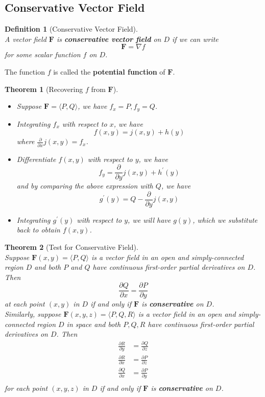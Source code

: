 \documentclass[12pt]{article}
\newtheorem{definition}{Definition}[section]
\newtheorem{theorem}{Theorem}[section]
\theoremstyle{definition}
\begin{document}
\subsection{Conservative Vector Field}
\begin{definition}[Conservative Vector Field]
\hfill\\\normalfont A vector field $\mathbf{F}$ is \textbf{conservative vector field} on $D$ if we can write
\[
\mathbf{F}= \nabla f
\]
for some scalar function $f$ on $D$.
\end{definition}
The function $f$ is called the \textbf{potential function} of $\mathbf{F}$.
\begin{theorem}[Recovering {$f$} from {$\mathbf{F}$}]\hfill\\\normalfont
\begin{itemize}
  \item Suppose $\mathbf{F} = \langle P,Q\rangle$, we have $f_x = P, f_y = Q$.
  \item Integrating $f_x$ with respect to $x$, we have
  \[
f(x,y) = j(x,y)+h(y)
  \]
  where $\frac{\partial}{\partial x}j(x,y) = f_x$.
  \item Differentiate $f(x,y)$ with respect to $y$, we have
  \[
f_y = \frac{\partial }{\partial y}j(x,y)+h^\prime(y)
  \]
  and by comparing the above expression with $Q$, we have\[g^\prime(y) = Q-\frac{\partial }{\partial y}j(x,y)\]
  \item Integrating $g^\prime(y)$ with respect to $y$, we will have $g(y)$, which we substitute back to obtain $f(x,y)$.
\end{itemize}
\end{theorem}
\begin{theorem}[Test for Conservative Field]
\hfill\\\normalfont Suppose $\mathbf{F}(x,y)=\langle P,Q\rangle$ is a vector field in an \textit{open} and \textit{simply-connected} region $D$ and both $P$ and $Q$ have continuous first-order partial derivatives on $D$. Then
\[
\frac{\partial Q}{\partial x} = \frac{\partial P}{\partial y}
\]
at \textit{each} point $(x,y)$ in $D$ if and only if $\mathbf{F}$ is \textbf{conservative} on $D$.\\
Similarly, suppose $\mathbf{F}(x,y,z) = \langle P,Q,R\rangle$ is a vector field in an open and simply-connected region $D$ in space and both $P,Q,R$ have continuous first-order partial derivatives on $D$. Then
\begin{align*}
\frac{\partial R}{\partial y}&=\frac{\partial Q}{\partial z}\\
\frac{\partial R}{\partial x}&=\frac{\partial P}{\partial z}\\
\frac{\partial Q}{\partial x}&=\frac{\partial P}{\partial y}\\
\end{align*}
for each point $(x,y,z)$ in $D$ if and only if $\mathbf{F}$ is \textbf{conservative} on $D$.
\end{theorem}
\end{document}
